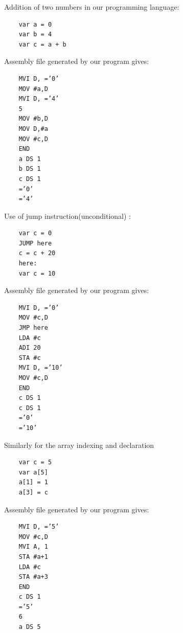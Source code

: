 \documentclass[a4paper,12pt]{extarticle}
\begin{document}
	Addition of two numbers in our programming language:
	\begin{verbatim}
	var a = 0
	var b = 4
	var c = a + b
	\end{verbatim}
	Assembly file generated by our program gives:
	\begin{verbatim}
	MVI D, =’0’
	MOV #a,D
	MVI D, =’4’
	5
	MOV #b,D
	MOV D,#a
	MOV #c,D
	END
	a DS 1
	b DS 1
	c DS 1
	=’0’
	=’4’
	\end{verbatim}
	Use of jump instruction(unconditional) :
	\begin{verbatim}
	var c = 0
	JUMP here
	c = c + 20
	here:
	var c = 10
	\end{verbatim}
	Assembly file generated by our program gives:
	\begin{verbatim}
	MVI D, =’0’
	MOV #c,D
	JMP here
	LDA #c
	ADI 20
	STA #c
	MVI D, =’10’
	MOV #c,D
	END
	c DS 1
	c DS 1
	=’0’
	=’10’
	\end{verbatim}
	Similarly for the array indexing and declaration
	\begin{verbatim}
	var c = 5
	var a[5]
	a[1] = 1
	a[3] = c
	\end{verbatim}
	Assembly file generated by our program gives:
	\begin{verbatim}
	MVI D, =’5’
	MOV #c,D
	MVI A, 1
	STA #a+1
	LDA #c
	STA #a+3
	END
	c DS 1
	=’5’
	6
	a DS 5
	\end{verbatim}
\end{document}
